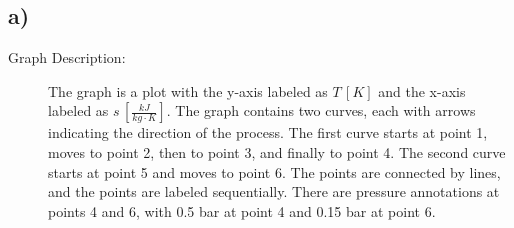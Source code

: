 

\subsection*{a)}
\begin{description}
    \item[Graph Description:] The graph is a plot with the y-axis labeled as \( T \, [K] \) and the x-axis labeled as \( s \, [\frac{kJ}{kg \cdot K}] \). The graph contains two curves, each with arrows indicating the direction of the process. The first curve starts at point 1, moves to point 2, then to point 3, and finally to point 4. The second curve starts at point 5 and moves to point 6. The points are connected by lines, and the points are labeled sequentially. There are pressure annotations at points 4 and 6, with 0.5 bar at point 4 and 0.15 bar at point 6.
\end{description}